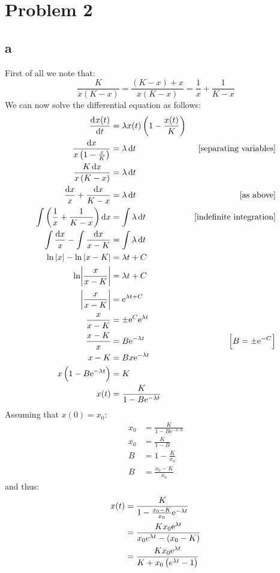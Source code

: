 \section*{Problem 2}
\subsection*{a}
First of all we note that:
\begin{equation*}
    \frac{K}{x (K - x)} = \frac{(K - x) + x}{x (K - x)} = \frac{1}{x} + \frac{1}{K - x}
\end{equation*}
We can now solve the differential equation as follows:
\begin{align*}
    \dod{x(t)}{t} &= \lambda x(t) \del{1 - \frac{x(t)}{K}} \\
    \frac{\dif x}{x \del{1 - \frac{x}{K}}} &= \lambda \dif t & [\mbox{separating variables}] \\
    \frac{K \dif x}{x \del{K - x}} &= \lambda \dif t \\
    \frac{\dif x}{x} + \frac{\dif x}{K - x} &= \lambda \dif t & [\mbox{as above}] \\
    \int \left( \frac{1}{x} + \frac{1}{K - x} \right) \dif x &= \int \lambda \dif t & [\mbox{indefinite integration}] \\
    \int \frac{\dif x}{x} - \int \frac{\dif x}{x - K} &= \int \lambda \dif t \\
    \ln|x| - \ln|x - K| &= \lambda t + C \\
    \ln\envert{\frac{x}{x - K}} &= \lambda t + C \\
    \envert[-1]{\frac{x}{x - K}} &= \mathrm{e}^{\lambda t + C} \\
    \frac{x}{x - K} &= \pm \mathrm{e}^{C} \mathrm{e}^{\lambda t} \\
    \frac{x - K}{x} &= B \mathrm{e}^{-\lambda t} &\sbr{B = \pm \mathrm{e}^{-C}} \\
    x - K &= Bx \mathrm{e}^{-\lambda t} \\
    x \del{1 - B \mathrm{e}^{-\lambda t}} &= K \\
    x(t) &= \frac{K}{1 - B \mathrm{e}^{-\lambda t}}
\end{align*}
Assuming that \( x(0) = x_0 \):
\begin{align*}
    x_0 &= \frac{K}{1 - B \mathrm{e}^{-\lambda \cdot 0}} \\
    x_0 &= \frac{K}{1 - B} \\
    B &= 1 - \frac{K}{x_0} \\
    B &= \frac{x_0 - K}{x_0}
\end{align*}
and thus:
\begin{align*}
    x(t) &= \frac{K}{1 - \frac{x_0 - K}{x_0} \mathrm{e}^{-\lambda t}} \\
         &= \frac{K x_0 \mathrm{e}^{\lambda t}}{x_0 e^{\lambda t} - (x_0 - K)} \\
         &= \frac{K x_0 \mathrm{e}^{\lambda t}}{K + x_0 \del{e^{\lambda t} - 1}}
\end{align*}

